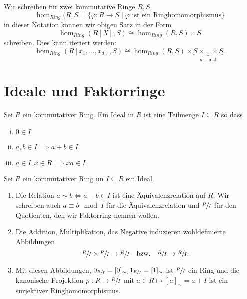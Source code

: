 \begin{notation}
	Wir schreiben für zwei kommutative Ringe $R,S$ 
	\[
		\hom_{Ring}(R,S = \{ \varphi: R \to S \mid \varphi \text{ ist ein Ringhomomorphismus}\} 
	\] 
	in dieser Notation können wir obigen Satz in der Form
	\[
		\hom_{Ring}(R[X],S) \cong \hom_{Ring}(R,S) \times S
	\] 
	schreiben. Dies kann iteriert werden:
	\[
		\hom_{Ring} (R[x_1,\ldots,x_{d}],S) \cong \hom_{Ring}(R,S) \times \underbrace{S\times \ldots \times S}_{d-\text{mal}}
	.\] 
\end{notation}




\section{Ideale und Faktorringe}

\begin{definition}
	Sei $R$ ein kommutativer Ring.
	Ein Ideal in $R$ ist eine Teilmenge $I \subseteq R$ so dass
	\begin{enumerate}[(i)]
		\item $0 \in I$ 
		\item $a,b \in I \implies a + b \in I$
		\item $a \in I, x \in R \implies xa \in I$
	\end{enumerate}
\end{definition}


\begin{theorem}
Sei $R$ ein kommutativer Ring un $I \subseteq R$ ein Ideal.
\begin{enumerate}
	\item Die Relation $a \sim b \Leftrightarrow a - b \in I$ ist eine Äquivalenzrelation auf $R$.
		Wir schreiben auch $a \equiv b \mod I$ für die Äquivalenzrelation und $\sfrac{R}{I}$ für den Quotienten, den wir Faktorring nennen wollen.
	\item Die Addition, Multiplikation, das Negative induzieren wohldefinierte Abbildungen
		\[
			\sfrac{R}{I} \times \sfrac{R}{I} \to \sfrac{R}{I} \qq{bzw.} \sfrac{R}{I} \to \sfrac{R}{I}
		.\] 
	\item Mit diesen Abbildungen, $0_{\sfrac{R}{I}} = [0]_{\sim}, 1_{\sfrac{R}{I}} = [1]_{\sim}$ ist $\sfrac{R}{I}$ ein Ring und die kanonische Projektion
		$p: R \to \sfrac{R}{I}$ mit $a \in R \mapsto [a]_{\sim} = a + I$ ist ein surjektiver Ringhomomorphismus.
\end{enumerate}
\end{theorem}




